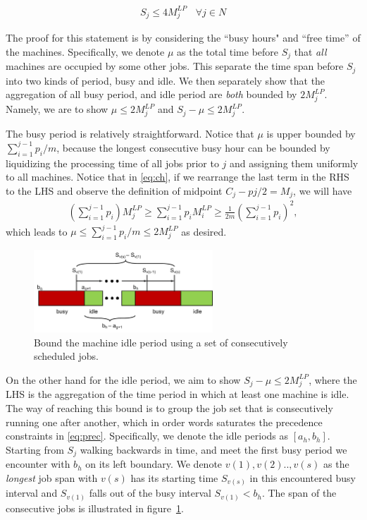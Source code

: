 \begin{align}
S_j \leq 4 M^{LP}_j \:\:\:\: \forall j \in N
\end{align}

The proof for this statement is by considering the ``busy hours" and ``free time'' of the machines. Specifically, we denote $\mu$ as the total time before $S_j$ that \emph{all} machines are occupied by some other jobs. This separate the time span before $S_j$ into two kinds of period, busy and idle. We then separately show that the aggregation of all busy period, and idle period are \emph{both} bounded by $2M^{LP}_j$. Namely, we are to show $\mu \leq 2 M^{LP}_j$ and  $S_j - \mu \leq 2 M^{LP}_j$.

The busy period is relatively straightforward. Notice that $\mu$ is upper bounded by $\sum_{i=1}^{j-1} p_i /m$, because the longest consecutive busy hour can be bounded by liquidizing the processing time of all jobs prior to $j$ and assigning them uniformly to all machines. Notice that in \eqref{eq:ch}, if we rearrange the last term in the RHS to the LHS and observe the definition of midpoint $C_j-pj/2 = M_j$, we will have 
\begin{align}
\left(\sum_{i=1}^{j-1}p_i\right)M^{LP}_j \geq \sum_{i=1}^{j-1} p_i M^{LP}_i \geq \frac{1}{2m}\left(\sum_{i=1}^{j-1}p_i\right)^2,
\end{align}
which leads to $\mu \leq \sum_{i=1}^{j-1} p_i /m \leq 2 M^{LP}_j$ as desired. 

\begin{figure}[h]
	\centering
	\includegraphics[width=0.6\textwidth]{figs/4-approx-1.pdf}
	\caption{Bound the machine idle period using a set of consecutively scheduled jobs.}
	\label{fig:4-approx}
\end{figure}

On the other hand for the idle period, we aim to show $S_j - \mu \leq 2 M^{LP}_j$, where the LHS is the aggregation of the time period in which at least one machine is idle. The way of reaching this bound is to group the job set that is consecutively running one after another, which in order words saturates the precedence constraints in \eqref{eq:prec}. Specifically, we denote the idle periods as $[a_h, b_h]$. Starting from $S_j$ walking backwards in time, and meet the first busy period we encounter with $b_h$ on its left boundary. We denote $v(1), v(2) .., v(s)$ as the \emph{longest} job span with $v(s)$ has its starting time $S_{v(s)}$ in this encountered busy interval and $S_{v(1)}$ falls out of the busy interval $S_{v(1)} < b_h$. The span of the consecutive jobs is illustrated in figure~\ref{fig:4-approx}. 

